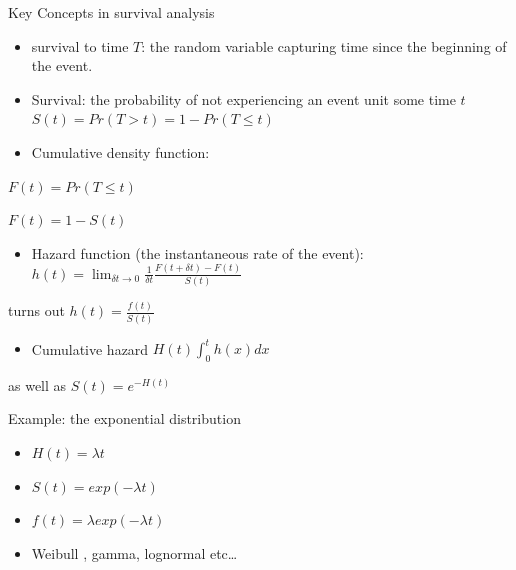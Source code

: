 \documentclass[
  ignorenonframetext,
]{beamer}
\providecommand{\tightlist}{%
  \setlength{\itemsep}{0pt}\setlength{\parskip}{0pt}}
\begin{document}
\begin{frame}{Key Concepts in survival analysis}
\protect\hypertarget{key-concepts-in-survival-analysis}{}

\begin{itemize}
\item
  survival to time \(T\): the random variable capturing time since the
  beginning of the event.
\item
  Survival: the probability of not experiencing an event unit some time
  \(t\) \(S(t) = Pr(T >t) = 1- Pr(T \leq t)\)
\item
  Cumulative density function:
\end{itemize}

\(F(t) = Pr(T \leq t)\)

\(F(t) = 1 - S(t)\)

\begin{itemize}
\tightlist
\item
  Hazard function (the instantaneous rate of the event):
  \(h(t) = \lim_{\delta t \rightarrow 0}\frac{1}{\delta t} \frac{ F(t + \delta t) - F(t)}{S(t)}\)
\end{itemize}

turns out \(h(t) = \frac{f(t)}{S(t)}\)

\begin{itemize}
\tightlist
\item
  Cumulative hazard \(H(t) \int^t_0 {h(x)dx}\)
\end{itemize}

as well as \(S(t) = e^{-H(t)}\)

\end{frame}

\begin{frame}{Example: the exponential distribution}
\protect\hypertarget{example-the-exponential-distribution}{}

\begin{itemize}
\item
  \(H(t) = \lambda t\)
\item
  \(S(t) = exp(-\lambda t)\)
\item
  \(f(t) = \lambda exp(-\lambda t)\)
\item
  Weibull , gamma, lognormal etc\ldots{}
\end{itemize}

\end{frame}
\end{document}
